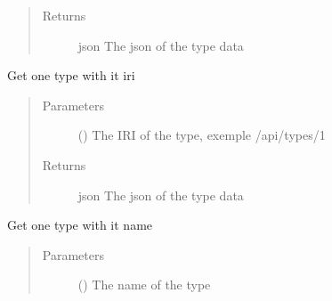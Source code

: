 \documentclass[letterpaper,10pt,english]{sphinxmanual}
\begin{document}
\begin{fulllineitems}
\begin{fulllineitems}
\begin{quote}
\begin{description}
\item[{Returns}] \leavevmode
\sphinxAtStartPar
json \textendash{} The json of the type data

\end{description}\end{quote}

\end{fulllineitems}


\begin{fulllineitems}
\label{\detokenize{index:Api.Api.get_type_by_iri}}
\sphinxAtStartPar
Get one type with it iri
\begin{quote}\begin{description}
\item[{Parameters}] \leavevmode
\sphinxAtStartPar
{} () \textendash{} The IRI of the type, exemple /api/types/1

\item[{Returns}] \leavevmode
\sphinxAtStartPar
json \textendash{} The json of the type data

\end{description}\end{quote}

\end{fulllineitems}


\begin{fulllineitems}
\label{\detokenize{index:Api.Api.get_type_by_name}}
\sphinxAtStartPar
Get one type with it name
\begin{quote}\begin{description}
\item[{Parameters}] \leavevmode
\sphinxAtStartPar
{} () \textendash{} The name of the type


\end{description}
\end{quote}
\end{fulllineitems}
\end{fulllineitems}
\end{document}
